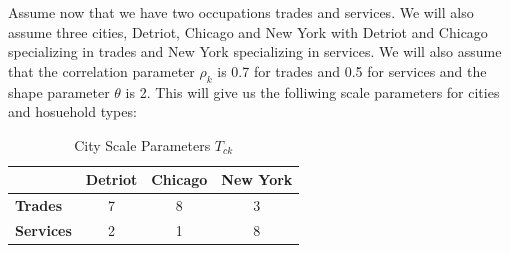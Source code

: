\documentclass[10pt]{article}
\begin{document}
Assume now that we have two occupations trades and services. We will also assume three cities, Detriot, Chicago and New York with Detriot and Chicago specializing in trades and New York specializing in services. We will also assume that the correlation parameter $\rho_k$ is 0.7 for trades and 0.5 for services and the shape parameter $\theta$ is 2. This will give us the folliwing scale parameters for cities and hosuehold types:

\vspace{2em}


\begin{table}[h]
    \centering
    \begin{tabular}{|l|c|c|c|}
        \hline
                          & \textbf{Detriot} & \textbf{Chicago} & \textbf{New York} \\
        \hline
        \textbf{Trades}   & 7                & 8                & 3                 \\
        \hline
        \textbf{Services} & 2                & 1                & 8                 \\
        \hline
    \end{tabular}
    \caption{City Scale Parameters $T_{ck}$}
    \label{city_shifter}
\end{table}
\end{document}
